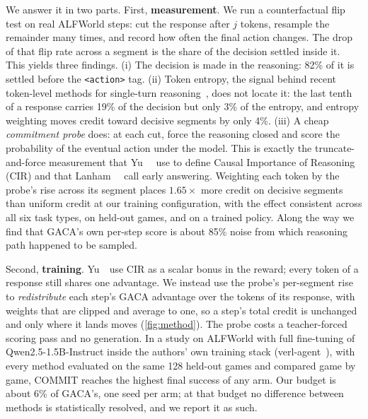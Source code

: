 We answer it in two parts. First, \textbf{measurement}. We run a counterfactual flip test on real
ALFWorld steps: cut the response after $j$ tokens, resample the remainder many times, and record how
often the final action changes. The drop of that flip rate across a segment is the share of the
decision settled inside it. This yields three findings. (i) The decision is made in the reasoning: 82\%
of it is settled before the \texttt{<action>} tag. (ii) Token entropy, the signal behind recent
token-level methods for single-turn reasoning~\cite{wang2025beyond}, does not locate it: the last tenth
of a response carries 19\% of the decision but only 3\% of the entropy, and entropy weighting moves
credit toward decisive segments by only 4\%. (iii) A cheap \emph{commitment probe} does: at each cut,
force the reasoning closed and score the probability of the eventual action under the model. This is
exactly the truncate-and-force measurement that Yu~\etal~\cite{yu2026cir} use to define Causal
Importance of Reasoning (CIR) and that Lanham~\etal~\cite{lanham2023faithfulness} call early
answering. Weighting each token by the probe's rise across its segment places $1.65\times$ more credit
on decisive segments than uniform credit at our training configuration, with the effect consistent
across all six task types, on held-out games, and on a trained policy. Along the way we find that
GACA's own per-step score is about 85\% noise from which reasoning path happened to be sampled.

Second, \textbf{training}. Yu~\etal~use CIR as a scalar bonus in the reward; every token of a response
still shares one advantage. We instead use the probe's per-segment rise to \emph{redistribute} each
step's GACA advantage over the tokens of its response, with weights that are clipped and average to
one, so a step's total credit is unchanged and only where it lands moves
(\cref{fig:method}). The probe costs a teacher-forced scoring pass and no generation. In a study on
ALFWorld with full fine-tuning of Qwen2.5-1.5B-Instruct inside the authors' own training stack
(verl-agent~\cite{feng2025gigpo,sheng2025hybridflow}), with every method evaluated on the same 128
held-out games and compared game by game, COMMIT reaches the highest final success of
any arm. Our budget is about 6\% of GACA's, one seed per arm; at that budget no difference between
methods is statistically resolved, and we report it as such.

